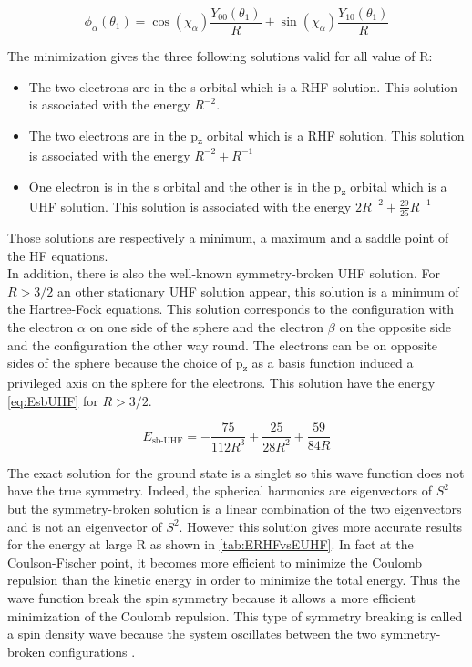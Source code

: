 \documentclass[11pt,a4paper]{article}
\begin{document}
\begin{equation}
\phi_\alpha(\theta_1)= \cos(\chi_\alpha)\frac{Y_{00}(\theta_1)}{R} + \sin(\chi_\alpha)\frac{Y_{10}(\theta_1)}{R}
\end{equation}
 
The minimization gives the three following solutions valid for all value of R:
\begin{itemize}
\item The two electrons are in the s orbital which is a RHF solution. This solution is associated with the energy $R^{-2}$.
\item The two electrons are in the p\textsubscript{z} orbital which is a RHF solution. This solution is associated with the energy $R^{-2} + R^{-1}$
\item One electron is in the s orbital and the other is in the p\textsubscript{z} orbital which is a UHF solution. This solution is associated with the energy $2R^{-2}+\frac{29}{25}R^{-1}$
\end{itemize}

Those solutions are respectively a minimum, a maximum and a saddle point of the HF equations.\\

In addition, there is also the well-known symmetry-broken UHF solution. For $R>3/2$ an other stationary UHF solution appear, this solution is a minimum of the Hartree-Fock equations. This solution corresponds to the configuration with the electron $\alpha$ on one side of the sphere and the electron $\beta$ on the opposite side and the configuration the other way round. The electrons can be on opposite sides of the sphere because the choice of p\textsubscript{z} as a basis function induced a privileged axis on the sphere for the electrons. This solution have the energy \eqref{eq:EsbUHF} for $R>3/2$.

\begin{equation}\label{eq:EsbUHF}
E_{\text{sb-UHF}}=-\frac{75}{112R^3}+\frac{25}{28R^2}+\frac{59}{84R}
\end{equation}

The exact solution for the ground state is a singlet so this wave function does not have the true symmetry. Indeed, the spherical harmonics are eigenvectors of $S^2$ but the symmetry-broken solution is a linear combination of the two eigenvectors and is not an eigenvector of $S^2$. However this solution gives more accurate results for the energy at large R as shown in \autoref{tab:ERHFvsEUHF}. In fact at the Coulson-Fischer point, it becomes more efficient to minimize the Coulomb repulsion than the kinetic energy in order to minimize the total energy. Thus the wave function break the spin symmetry because it allows a more efficient minimization of the Coulomb repulsion. This type of symmetry breaking is called a spin density wave because the system oscillates between the two symmetry-broken configurations \cite{GiulianiBook}.
\end{document}
